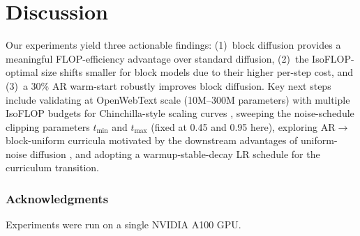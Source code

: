 \documentclass{article}
\begin{document}
\section{Discussion}

Our experiments yield three actionable findings: (1)~block diffusion provides a meaningful FLOP-efficiency advantage over standard diffusion, (2)~the IsoFLOP-optimal size shifts smaller for block models due to their higher per-step cost, and (3)~a 30\% AR warm-start robustly improves block diffusion.
Key next steps include validating at OpenWebText scale (10M--300M parameters) with multiple IsoFLOP budgets for Chinchilla-style scaling curves \citep{hoffmann2022training}, sweeping the noise-schedule clipping parameters $t_{\min}$ and $t_{\max}$ (fixed at 0.45 and 0.95 here), exploring AR$\to$block-uniform curricula motivated by the downstream advantages of uniform-noise diffusion \citep{nie2025scaling}, and adopting a warmup-stable-decay LR schedule for the curriculum transition.

\subsubsection*{Acknowledgments}
Experiments were run on a single NVIDIA A100 GPU.



\end{document}
